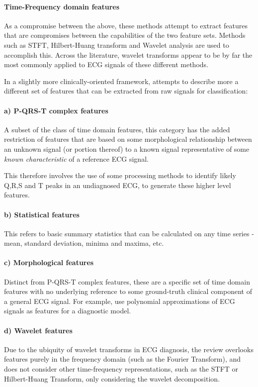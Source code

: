 \documentclass[9pt,conference]{IEEEtran}
\begin{document}
\paragraph{\textbf{Time-Frequency domain features}}
As a compromise between the above, these methods attempt to extract features that are compromises between the capabilities of the two feature sets. Methods such as STFT, Hilbert-Huang transform and Wavelet analysis are used to accomplish this. Across the literature, wavelet transforms appear to be by far the most commonly applied to ECG signals of these different methods.

In a slightly more clinically-oriented framework, \cite{KAPLANBERKAYA2018216} attempts to describe more a different set of features that can be extracted from raw signals for classification:

\paragraph*{a) \textbf{P-QRS-T complex features}}
A subset of the class of time domain features, this category has the added restriction of features that are based on some morphological relationship between an unknown signal (or portion thereof) to a known signal representative of some \textit{known characteristic} of a reference ECG signal.

This therefore involves the use of some processing methods to identify likely Q,R,S and T peaks in an undiagnosed ECG, to generate these higher level features.
\paragraph*{b) \textbf{Statistical features}}
This refers to basic summary statistics that can be calculated on any time series - mean, standard deviation, minima and maxima, etc.

\paragraph*{c) \textbf{Morphological features}}
Distinct from P-QRS-T complex features, these are a specific set of time domain features with no underlying reference to some ground-truth clinical component of a general ECG signal. For example, \cite{polyApprox} use polynomial approximations of ECG signals as features for a diagnostic model.

\paragraph*{d) \textbf{Wavelet features}}
Due to the ubiquity of wavelet transforms in ECG diagnosis, the review overlooks features purely in the frequency domain (such as the Fourier Transform), and does not consider other time-frequency representations, such as the STFT or Hilbert-Huang Transform, only considering the wavelet decomposition.
\end{document}
